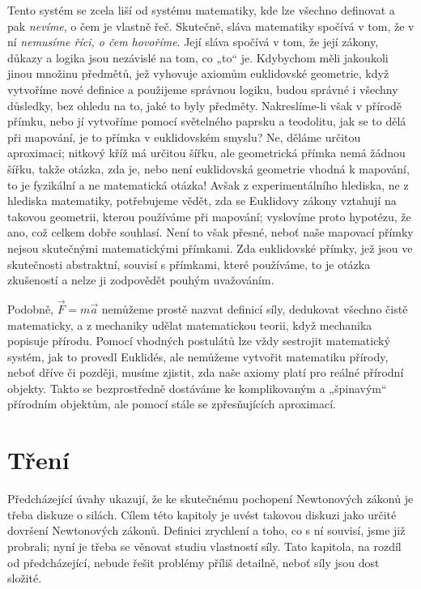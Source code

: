    Tento systém se zcela liší od systému matematiky, kde lze všechno definovat a pak 
    \emph{nevíme}, o čem je vlastně řeč. Skutečně, sláva matematiky spočívá v tom, že v ní 
    \emph{nemusíme říci, o čem hovoříme}. Její sláva spočívá v tom, že její zákony, důkazy a logika 
    jsou nezávislé na tom, co „to“ je. Kdybychom měli jakoukoli jinou množinu předmětů, jež 
    vyhovuje axiomům euklidovské geometrie, když vytvoříme nové definice a použijeme správnou 
    logiku, budou správné i všechny důsledky, bez ohledu na to, jaké to byly předměty. 
    Nakreslíme-li však v přírodě přímku, nebo jí vytvoříme pomocí světelného paprsku a teodolitu, 
    jak se to dělá při mapování, je to přímka v euklidovském smyslu? Ne, děláme určitou aproximaci; 
    nitkový kříž má určitou šířku, ale geometrická přímka nemá žádnou šířku, takže otázka, zda je, 
    nebo není euklidovská geometrie vhodná k mapování, to je fyzikální a ne matematická otázka! 
    Avšak z experimentálního hlediska, ne z hlediska matematiky, potřebujeme vědět, zda se 
    Euklidovy zákony vztahují na takovou geometrii, kterou používáme při mapování; vyslovíme proto 
    hypotézu, že ano, což celkem dobře souhlasí. Není to však přesné, neboť naše mapovací přímky 
    nejsou skutečnými matematickými přímkami. Zda euklidovské přímky, jež jsou ve skutečnosti 
    abstraktní, souvisí s přímkami, které používáme, to je otázka zkušeností a nelze ji zodpovědět 
    pouhým uvažováním.
    
    Podobně, \(\vec{F}= m\vec{a}\) nemůžeme prostě nazvat definicí síly, dedukovat všechno čistě 
    matematicky, a z mechaniky udělat matematickou teorii, když mechanika popisuje přírodu. Pomocí 
    vhodných postulátů lze vždy sestrojit matematický systém, jak to provedl Euklidés, ale nemůžeme 
    vytvořit matematiku přírody, neboť dříve či později, musíme zjistit, zda naše axiomy platí pro 
    reálné přírodní objekty. Takto se bezprostředně dostáváme ke komplikovaným a „špinavým“ 
    přírodním objektům, ale pomocí stále se zpřesňujících aproximací.
    
  \section{Tření}\label{fyz:IchapXIIsecII}
    Předcházející úvahy ukazují, že ke skutečnému pochopení Newtonových zákonů je třeba diskuze o 
    silách. Cílem této kapitoly je uvést takovou diskuzi jako určité dovršení Newtonových zákonů. 
    Definici zrychlení a toho, co s ní souvisí, jsme již probrali; nyní je třeba se věnovat studiu 
    vlastností síly. Tato kapitola, na rozdíl od předcházející, nebude řešit problémy příliš 
    detailně, neboť síly jsou dost složité.
    
